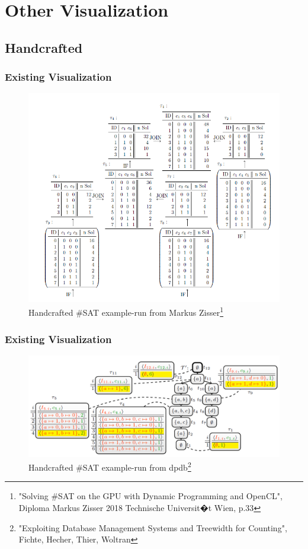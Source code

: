 \documentclass[c,8pt,xcolor...,x11names]{beamer}
\begin{document}
\section{Other Visualization}
\subsection{Handcrafted}
\begin{frame}
	\frametitle{Existing Visualization}
	\begin{figure}
		\centering
		\includegraphics[width=0.6\linewidth]{images/DualDA43.png}
		\caption{Handcrafted \#SAT example-run from Markus Zisser\footnote{"Solving \#SAT on the GPU with Dynamic Programming and OpenCL",\\ Diploma Markus Zisser 2018 Technische Universit�t Wien, p.33}}
		\label{fig:dualda43}
	\end{figure}
	
\end{frame}
\begin{frame}
	\frametitle{Existing Visualization}
	\begin{figure}
		\centering
		\includegraphics[width=\linewidth]{images/dpdbVisuSat.png}
		\caption{Handcrafted \#SAT example-run from dpdb\footnote{"Exploiting Database Management Systems and Treewidth for Counting",\\ Fichte, Hecher, Thier, Woltran} }
		\label{fig:dpdbVisuSat}
	\end{figure}
	
	
\end{frame}
\end{document}
